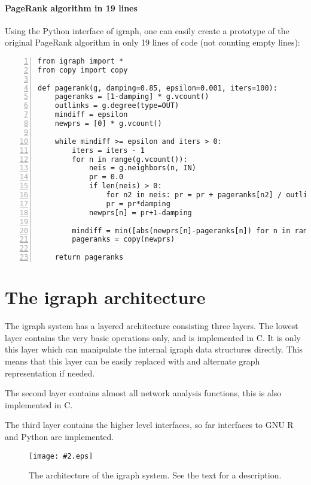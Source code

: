 \documentclass[twoside]{book}%
\newcommand{\figfigure}[2]{%
  \begin{psfrags}
  
  \texttt{[image: \#2.eps]}
  \end{psfrags}
}
\begin{document}
\paragraph{PageRank algorithm in 19 lines} Using the Python interface
of igraph, one can easily create a prototype of the original PageRank
algorithm in only 19 lines of code (not counting empty lines):

\begin{Verbatim}[fontsize=\small,numbers=left]
from igraph import *
from copy import copy

def pagerank(g, damping=0.85, epsilon=0.001, iters=100):
    pageranks = [1-damping] * g.vcount()
    outlinks = g.degree(type=OUT)
    mindiff = epsilon
    newprs = [0] * g.vcount()
    
    while mindiff >= epsilon and iters > 0:
        iters = iters - 1
        for n in range(g.vcount()):
            neis = g.neighbors(n, IN)
            pr = 0.0
            if len(neis) > 0:
                for n2 in neis: pr = pr + pageranks[n2] / outlinks[n2]
                pr = pr*damping
            newprs[n] = pr+1-damping
	    
        mindiff = min([abs(newprs[n]-pageranks[n]) for n in range(g.vcount())])
        pageranks = copy(newprs)
	
    return pageranks
\end{Verbatim}

\section{The igraph architecture}

The igraph system has a layered architecture consisting three
layers. The lowest layer contains the very basic operations only, and
is implemented in C. It is only this layer which can manipulate the
internal igraph data structures directly. This means that this layer
can be easily replaced with and alternate graph representation if
needed.

The second layer contains almost all network analysis functions, this
is also implemented in C. 

The third layer contains the higher level interfaces, so far
interfaces to GNU R and Python are implemented.

\begin{figure}
\centering
\figfigure{0.6\textwidth}{arch}
\caption{The architecture of the igraph system. See the text for a
  description. }
\end{figure}
\end{document}
